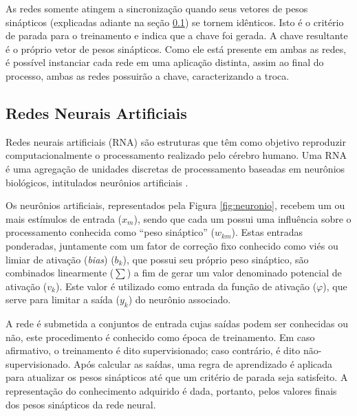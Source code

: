 \documentclass[12pt]{article}
\begin{document}
            
            
            As redes somente atingem a sincronização quando seus vetores de pesos sinápticos (explicadas adiante na seção \ref{subsec:redes_neurais}) se tornem idênticos. Isto é o critério de parada para o treinamento e indica que a chave foi gerada. A chave resultante é o próprio vetor de pesos sinápticos. Como ele está presente em ambas as redes, é possível instanciar cada rede em uma aplicação distinta, assim ao final do processo, ambas as redes possuirão a chave, caracterizando a troca.
            
        \subsection{Redes Neurais Artificiais}
        \label{subsec:redes_neurais}
        
            Redes neurais artificiais (RNA) são estruturas que têm como objetivo reproduzir computacionalmente o processamento realizado pelo cérebro humano. Uma RNA é uma agregação de unidades discretas de processamento baseadas em neurônios biológicos, intitulados neurônios artificiais \cite{aragao2018antispam}.
            
            
            
            Os neurônios artificiais, representados pela Figura \ref{fig:neuronio}, recebem um ou mais estímulos de entrada ($x_m$), sendo que cada um possui uma influência sobre o processamento conhecida como ``peso sináptico'' ($w_{km}$). Estas entradas ponderadas, juntamente com um fator de correção fixo conhecido como viés ou limiar de ativação (\textit{bias}) ($b_k$), que possui seu próprio peso sináptico, são combinados linearmente ($\sum$) a fim de gerar um valor denominado potencial de ativação ($v_k$). Este valor é utilizado como entrada da função de ativação ($\varphi$), que serve para limitar a saída ($y_k$) do neurônio associado.
            
            A rede é submetida a conjuntos de entrada cujas saídas podem ser conhecidas ou não, este procedimento é conhecido como época de treinamento. Em caso afirmativo, o treinamento é dito supervisionado; caso contrário, é dito não-supervisionado. Após calcular as saídas, uma regra de aprendizado é aplicada para atualizar os pesos sinápticos até que um critério de parada seja satisfeito. A representação do conhecimento adquirido é dada, portanto, pelos valores finais dos pesos sinápticos da rede neural.
            
\end{document}
